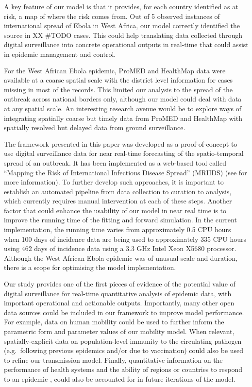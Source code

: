 \documentclass[9pt,twocolumn,twoside,lineno]{pnas-new}
\begin{document}
A key feature of our model is that it
provides, for each country identified as at risk, a map of where the
risk comes from. Out of 5 observed instances of international spread
of Ebola in West Africa, our model correctly identified the source
in XX #TODO cases. This could help translating data collected through
digital surveillance into concrete operational outputs in real-time
that could assist in epidemic management and control. 

For the West African Ebola epidemic, ProMED and HealthMap data were
available at a coarse spatial scale with the district level information
for cases missing in most of the records. This limited our analysis to
the spread of the outbreak across national borders only, although our
model could deal with data at any spatial scale. An interesting research
avenue would be to explore ways of integrating spatially coarse but
timely data from ProMED and HealthMap with spatially resolved but
delayed data from ground surveillance.


The framework presented in this paper was developed as a
proof-of-concept to use digital surveillance data for near real-time
forecasting of the spatio-temporal spread of an outbreak. It has been
implemented as a web-based tool called ``Mapping the Risk of
International Infectious Disease Spread'' (MRIIDS) (see
\cite{mriidswiki} for more information). To further develop such
approaches, it is important to establish an automated pipeline from data
collection to curation to analysis, which currently requires manual
intervention at each of these steps. Another factor that could enhance
the usability of our model in near real time is to improve the running
time of the fitting and forward simulation. In the current
implementation, the running time varies from approximately 0.5 CPU hours when
100 days of incidence data are being used to approximately 335 CPU hours
using 462 days of incidence data using a 3.3 GHz Intel Xeon X5680
processor. Although the West African Ebola epidemic was of unusual scale
and duration, there is a scope for optimising the model implementation.

Our study provides one of the first pieces of evidence of the potential
value of digital surveillance for real-time quantitative analysis of
epidemic data, with important operational and actionable outputs.
Importantly, many other open data sources could be included in our
framework to improve model performance. For example, data on human
mobility could be used to further inform the parametric form and
parameter values of our mobility model. When relevant,
spatially-explicit data on population-level immunity to the circulating
pathogen (e.g.~following previous epidemics and/or due to vaccination)
could also be used to refine our transmission model. Finally,
quantitative information on the performance of health systems and the
ability of regions or countries to respond to an epidemic
\cite{healthsites}, \cite{maina2019spatial} could also be accounted for
in future iterations of the model.
\end{document}
